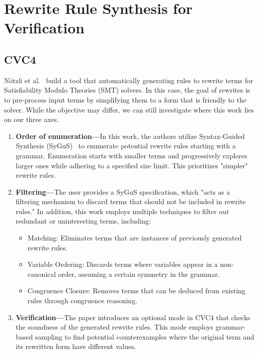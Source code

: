 \documentclass[acmsmall,screen,nonacm]{acmart}
\begin{document}
\section{Rewrite Rule Synthesis for Verification}

\subsection{CVC4}
N{\"o}tzli et al.~\cite{notzli2019cvc4} build a tool that automatically generating rules to rewrite terms for Satisfiability Modulo Theories (SMT) solvers. In this case, the goal of rewrites is to pre-process input terms by simplifying them to a form that is friendly to the solver. While the objective may differ, we can still investigate where this work lies on our three axes.

\begin{enumerate}
    \item \textbf{Order of enumeration---}In this work, the authors utilize Syntax-Guided Synthesis (SyGuS)~\cite{alur2013sygus} to enumerate potential rewrite rules starting with a grammar. Enumeration starts with smaller terms and progressively explores larger ones while adhering to a specified size limit. This prioritizes "simpler" rewrite rules.

    \item \textbf{Filtering---}The user provides a SyGuS specification, which "acts as a filtering mechanism to discard terms that should not be included in rewrite rules." In addition, this work employs multiple techniques to filter out redundant or uninteresting terms, including:
    
    \begin{itemize}
        \item Matching: Eliminates terms that are instances of previously generated rewrite rules.
        \item Variable Ordering: Discards terms where variables appear in a non-canonical order, assuming a certain symmetry in the grammar.
        \item Congruence Closure: Removes terms that can be deduced from existing rules through congruence reasoning.
    \end{itemize}
        
    \item \textbf{Verification---}The paper introduces an optional mode in CVC4 that checks the soundness of the generated rewrite rules. This mode employs grammar-based sampling to find potential counterexamples where the original term and its rewritten form have different values.
\end{enumerate}
\end{document}
